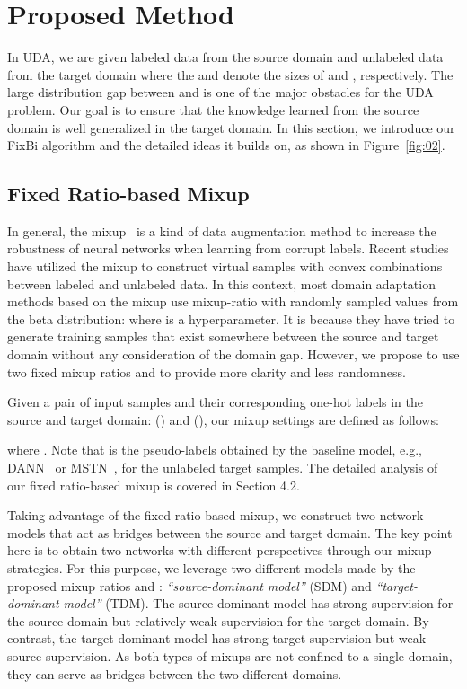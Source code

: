 \documentclass[final]{cvpr}
\begin{document}
\section{Proposed Method}
In UDA, we are given labeled data  from the source domain and unlabeled data  from the target domain where the  and  denote the sizes of  and , respectively. The large distribution gap between  and  is one of the major obstacles for the UDA problem. Our goal is to ensure that the knowledge learned from the source domain is well generalized in the target domain. In this section, we introduce our FixBi algorithm and the detailed ideas it builds on, as shown in Figure~\ref{fig:02}. 

\subsection{Fixed Ratio-based Mixup}
In general, the mixup~\cite{MixUp} is a kind of data augmentation method to increase the robustness of neural networks when learning from corrupt labels. Recent studies \cite{MixMatch, FixMatch} have utilized the mixup to construct virtual samples with convex combinations between labeled and unlabeled data. In this context, most domain adaptation methods \cite{VMT, Minghao2020, MiCo2020, Wu2020} based on the mixup use mixup-ratio  with randomly sampled values from the beta distribution:  where  is a hyperparameter.
It is because they have tried to generate training samples that exist somewhere between the source and target domain without any consideration of the domain gap. However, we propose to use two fixed mixup ratios  and  to provide more clarity and less randomness.

Given a pair of input samples and their corresponding one-hot labels in the source and target domain: () and (), our mixup settings are defined as follows:


where . Note that  is the pseudo-labels obtained by the baseline model, e.g., DANN~\cite{Ganin2015} or MSTN~\cite{MSTN}, for the unlabeled target samples. The detailed analysis of our fixed ratio-based mixup is covered in Section 4.2.

Taking advantage of the fixed ratio-based mixup, we construct two network models that act as bridges between the source and target domain. The key point here is to obtain two networks with different perspectives through our mixup strategies. For this purpose, we leverage two different models made by the proposed mixup ratios  and : \emph{“source-dominant model”} (SDM) and \emph{“target-dominant model”} (TDM). The source-dominant model has strong supervision for the source domain but relatively weak supervision for the target domain. By contrast, the target-dominant model has strong target supervision but weak source supervision. As both types of mixups are not confined to a single domain, they can serve as bridges between the two different domains.
\end{document}

